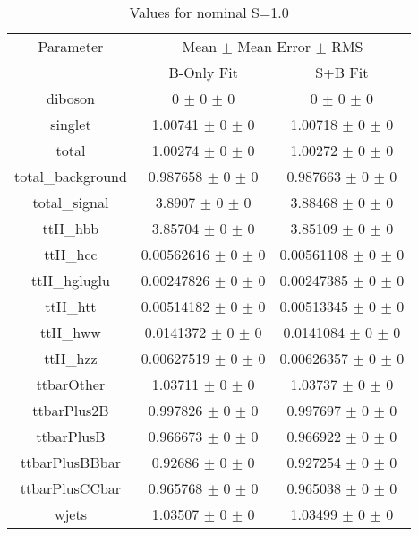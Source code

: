 \begin{table}
\centering
\caption{Values for nominal S=1.0}
\begin{tabular}{ccc}
\toprule
Parameter 	& \multicolumn{2}{c}{Mean $\pm$ Mean Error $\pm$ RMS}\\
 	& B-Only Fit & S+B Fit\\
\midrule
diboson 	& \num{0} $\pm$ \num{0} $\pm$ \num{0} 	& \num{0} $\pm$ \num{0} $\pm$ \num{0}\\
singlet 	& \num{1.00741} $\pm$ \num{0} $\pm$ \num{0} 	& \num{1.00718} $\pm$ \num{0} $\pm$ \num{0}\\
total 	& \num{1.00274} $\pm$ \num{0} $\pm$ \num{0} 	& \num{1.00272} $\pm$ \num{0} $\pm$ \num{0}\\
total\_background 	& \num{0.987658} $\pm$ \num{0} $\pm$ \num{0} 	& \num{0.987663} $\pm$ \num{0} $\pm$ \num{0}\\
total\_signal 	& \num{3.8907} $\pm$ \num{0} $\pm$ \num{0} 	& \num{3.88468} $\pm$ \num{0} $\pm$ \num{0}\\
ttH\_hbb 	& \num{3.85704} $\pm$ \num{0} $\pm$ \num{0} 	& \num{3.85109} $\pm$ \num{0} $\pm$ \num{0}\\
ttH\_hcc 	& \num{0.00562616} $\pm$ \num{0} $\pm$ \num{0} 	& \num{0.00561108} $\pm$ \num{0} $\pm$ \num{0}\\
ttH\_hgluglu 	& \num{0.00247826} $\pm$ \num{0} $\pm$ \num{0} 	& \num{0.00247385} $\pm$ \num{0} $\pm$ \num{0}\\
ttH\_htt 	& \num{0.00514182} $\pm$ \num{0} $\pm$ \num{0} 	& \num{0.00513345} $\pm$ \num{0} $\pm$ \num{0}\\
ttH\_hww 	& \num{0.0141372} $\pm$ \num{0} $\pm$ \num{0} 	& \num{0.0141084} $\pm$ \num{0} $\pm$ \num{0}\\
ttH\_hzz 	& \num{0.00627519} $\pm$ \num{0} $\pm$ \num{0} 	& \num{0.00626357} $\pm$ \num{0} $\pm$ \num{0}\\
ttbarOther 	& \num{1.03711} $\pm$ \num{0} $\pm$ \num{0} 	& \num{1.03737} $\pm$ \num{0} $\pm$ \num{0}\\
ttbarPlus2B 	& \num{0.997826} $\pm$ \num{0} $\pm$ \num{0} 	& \num{0.997697} $\pm$ \num{0} $\pm$ \num{0}\\
ttbarPlusB 	& \num{0.966673} $\pm$ \num{0} $\pm$ \num{0} 	& \num{0.966922} $\pm$ \num{0} $\pm$ \num{0}\\
ttbarPlusBBbar 	& \num{0.92686} $\pm$ \num{0} $\pm$ \num{0} 	& \num{0.927254} $\pm$ \num{0} $\pm$ \num{0}\\
ttbarPlusCCbar 	& \num{0.965768} $\pm$ \num{0} $\pm$ \num{0} 	& \num{0.965038} $\pm$ \num{0} $\pm$ \num{0}\\
wjets 	& \num{1.03507} $\pm$ \num{0} $\pm$ \num{0} 	& \num{1.03499} $\pm$ \num{0} $\pm$ \num{0}\\
\bottomrule
\end{tabular}
\end{table}